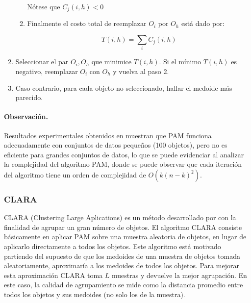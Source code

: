 \documentclass[12pt,oneside]{book}\usepackage[]{graphicx}\usepackage[]{color}
\theoremstyle{definition} %
\begin{document}
\begin{enumerate}
\begin{enumerate}
Nótese que $C_{j}(i,h)<0$

\item Finalmente el costo total de reemplazar $O_i$ por $O_h$ está dado por:

$$T(i,h)= \sum_{i} C_{j}(i,h)$$

\end{enumerate} 





\item Seleccionar el par $O_i, O_h$ que minimice $T(i,h)$. Si el mínimo $T(i,h)$ es negativo, reemplazar $O_i$ con $O_h$ y vuelva al paso 2. 
\item Caso contrario, para cada objeto no seleccionado, hallar el medoide más parecido.  
\end{enumerate}

\paragraph{Observación.} Resultados experimentales obtenidos en \citeauthor{rousseeuw1990finding} \citeyear{rousseeuw1990finding} muestran que PAM funciona adecuadamente con conjuntos de datos pequeños (100 objetos), pero no es eficiente para grandes conjuntos de datos, lo que se puede evidenciar al analizar la complejidad del algoritmo PAM, donde se puede observar que cada iteración del algoritmo tiene un orden de complejidad de $O(k(n-k)^2)$.











\subsubsection{CLARA}
CLARA (Clustering Large Aplications) es un método desarrollado por \citeauthor{rousseeuw1990finding} con la finalidad de agrupar un gran número de objetos. El algoritmo CLARA consiste básicamente  en aplicar PAM sobre una muestra aleatoria de objetos, en lugar de aplicarlo directamente a todos los objetos. Este algoritmo está motivado partiendo del supuesto  de que los medoides de una muestra de objetos tomada aleatoriamente, aproximaría a los medoides de todos los objetos. Para mejorar esta aproximación CLARA toma $L$ muestras  y devuelve la mejor agrupación. En este caso, la calidad de agrupamiento se mide como la distancia promedio entre todos los objetos y sus medoides (no solo los de la muestra).
\end{document}
